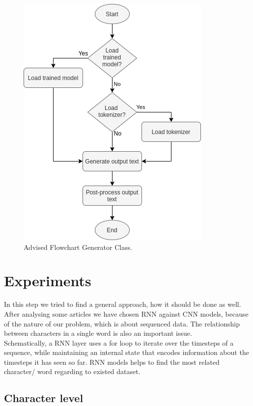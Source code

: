 \documentclass[hidelinks, conference]{IEEEtran}
\begin{document}
\begin{figure}[htbp]
\centerline{\includegraphics[scale=0.65]{pictures/flowchart_generator.png}}
\caption{Advised Flowchart Generator Class.}
\label{fig:flowchart_generator}
\end{figure}

\section{Experiments}

In this step we tried to find a general approach, how it should be done as well. After analysing some articles we have chosen RNN against CNN models, because of the nature of our problem, which is about sequenced data. The relationship between characters in a single word is also an important issue.\\
Schematically, a RNN layer uses a for loop to iterate over the timesteps of a sequence, while maintaining an internal state that encodes information about the timesteps it has seen so far. RNN models helps to find the most related character/ word regarding to existed dataset.

\subsection{Character level}\label{subsec_character_level}
\end{document}
